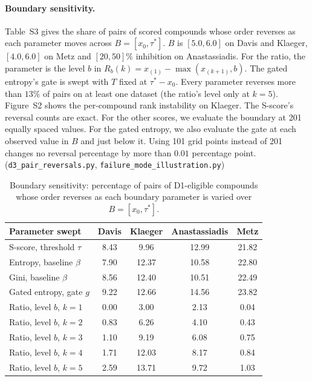 \documentclass[11pt]{article}
\begin{document}
\paragraph{Boundary sensitivity.} Table~S3 gives the share of pairs of scored
compounds whose order reverses as each parameter moves across
$B = [x_0, \tau^*]$. $B$ is $[5.0, 6.0]$ on Davis and Klaeger, $[4.0, 6.0]$ on
Metz and $[20, 50]\%$ inhibition on Anastassiadis. For the ratio, the parameter
is the level $b$ in $R_b(k) = x_{(1)} - \max(x_{(k+1)}, b)$. The gated
entropy's gate is swept with $T$ fixed at $\tau^* - x_0$. Every parameter
reverses more than $13\%$ of pairs on at least one dataset (the ratio's level only at $k = 5$). Figure~S2 shows the per-compound rank instability
on Klaeger. The S-score's reversal counts are exact. For the other scores,
we evaluate the boundary at 201 equally spaced values. For the gated entropy,
we also evaluate the gate at each observed value in $B$ and just below it.
Using 101 grid points instead of 201 changes no reversal
percentage by more than $0.01$ percentage point.
(\texttt{d3\_pair\_reversals.py},
\texttt{failure\_mode\_illustration.py})

\begin{table}[h]
\centering
\caption{Boundary sensitivity: percentage of pairs of D1-eligible compounds
whose order reverses as each boundary parameter is varied over
$B = [x_0, \tau^*]$.}
\small
\begin{tabular}{lcccc}
\toprule
Parameter swept & Davis & Klaeger & Anastassiadis & Metz \\
\midrule
S-score, threshold $\tau$ & 8.43 & 9.96 & 12.99 & 21.82 \\
Entropy, baseline $\beta$ & 7.90 & 12.37 & 10.58 & 22.80 \\
Gini, baseline $\beta$ & 8.56 & 12.40 & 10.51 & 22.49 \\
Gated entropy, gate $g$ & 9.22 & 12.66 & 14.56 & 23.82 \\
Ratio, level $b$, $k = 1$ & 0.00 & 3.00 & 2.13 & 0.04 \\
Ratio, level $b$, $k = 2$ & 0.83 & 6.26 & 4.10 & 0.43 \\
Ratio, level $b$, $k = 3$ & 1.10 & 9.19 & 6.08 & 0.75 \\
Ratio, level $b$, $k = 4$ & 1.71 & 12.03 & 8.17 & 0.84 \\
Ratio, level $b$, $k = 5$ & 2.59 & 13.71 & 9.72 & 1.03 \\
\bottomrule
\end{tabular}
\end{table}
\end{document}

